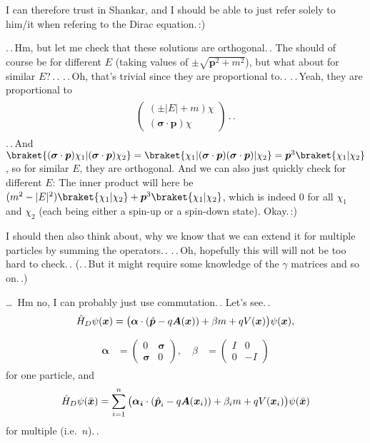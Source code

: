 \documentclass{report}
\newcommand{\bsacc}[3]{#1{\boldsymbol{#2}\hspace{#3em}}\hspace{-#3em}}
\newcommand{\hatbsp}{{\bsacc{\hat}{p}{.15}}}
\newcommand{\barbsx}{{\bsacc{\bar}{x}{.05}}}
\begin{document}
I can therefore trust in Shankar, and I should be able to just refer solely to him/it when refering to the Dirac equation.\,:) 

.\,.\,Hm, but let me check that these solutions are orthogonal.\,. The should of course be for different $E$ (taking values of $\pm\sqrt{\boldsymbol{p}^2 + m^2}$), but what about for similar $E$?\,.\,. .\,.\,Oh, that's trivial since they are proportional to.\,. .\,.\,Yeah, they are proportional to 
\begin{align}
\begin{aligned}
		\begin{pmatrix}
		(\pm |E| + m) \chi \\
		(\boldsymbol{\sigma} \cdot \boldsymbol{p}) \chi
		\end{pmatrix}\,.\,.
\end{aligned}
\end{align}
.\,.\,And 
$\braket{(\boldsymbol{\sigma} \cdot \boldsymbol{p}) \chi_1 |
(\boldsymbol{\sigma} \cdot \boldsymbol{p}) \chi_2} = 
\braket{\chi_1 | (\boldsymbol{\sigma} \cdot \boldsymbol{p}) 
(\boldsymbol{\sigma} \cdot \boldsymbol{p}) | \chi_2} =
\boldsymbol{p}^3 \braket{\chi_1 | \chi_2}$, so for similar $E$, they are orthogonal. And we can also just quickly check for different $E$: The inner product will here be 
$(m^2 - |E|^2)\braket{\chi_1 | \chi_2} + \boldsymbol{p}^3 \braket{\chi_1 | \chi_2}$, which is indeed 0 for all $\chi_1$ and $\chi_2$ (each being either a spin-up or a spin-down state). Okay.\,:) 

I should then also think about, why we know that we can extend it for multiple particles by summing the operators.\,. .\,.\,Oh, hopefully this will will not be too hard to check.\,. (.\,.\,But it might require some knowledge of the $\gamma$ matrices and so on.\,.) %

\ldots\ Hm no, I can probably just use commutation.\,. Let's see.\,. 
\begin{align}
	\hat H_D \psi(\boldsymbol{x}) = \big(
		\boldsymbol{\alpha} \cdot (\hatbsp - q \boldsymbol{A}(\boldsymbol{x})) +
		\beta m +
		q V(\boldsymbol{x})
	\big)\psi(\boldsymbol{x}),
\end{align}
\begin{align}
\begin{aligned}
	\boldsymbol{\alpha} &=
		\begin{pmatrix}
		0 & 					\boldsymbol{\sigma} \\
		\boldsymbol{\sigma} & 	0
		\end{pmatrix},
		\quad
	\beta &=
		\begin{pmatrix}
		I & 					0 \\
		0 & 					-I
		\end{pmatrix}
\end{aligned}
\end{align}
for one particle, and
\begin{align}
	\hat H_D \psi(\barbsx) = \sum_{i=1}^{n}\big(
		\boldsymbol{\alpha_i} \cdot (\hatbsp_i - q \boldsymbol{A}(\boldsymbol{x}_i)) +
		\beta_i m +
		q V(\boldsymbol{x}_i)
	\big)\psi(\barbsx)
\end{align}
for multiple (i.e.\ $n$).\,. 
\end{document}
